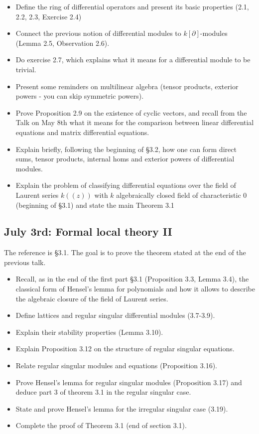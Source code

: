 \documentclass{amsart}
\theoremstyle{definition}
\theoremstyle{remark}
\begin{document}
\begin{itemize}
\item Define the ring of differential operators and present its basic properties (2.1, 2.2, 2.3, Exercise 2.4)
\item Connect the previous notion of differential modules to \(k[\partial]\)-modules (Lemma 2.5, Observation 2.6).
\item Do exercise 2.7, which explains what it means for a differential module to be trivial.
\item Present some reminders on multilinear algebra (tensor products, exterior powers - you can skip symmetric powers).
\item Prove Proposition 2.9 on the existence of cyclic vectors, and recall from the Talk on May 8th what it means for the comparison between linear differential equations and matrix differential equations.
\item Explain briefly, following the beginning of \S 3.2, how one can form direct sums, tensor products, internal homs and exterior powers of differential modules.
\item Explain the problem of classifying differential equations over the field of Laurent series \(k((z))\) with \(k\) algebraically closed field of characteristic \(0\) (beginning of \S 3.1) and state the main Theorem 3.1
\end{itemize}
  
\subsection{July 3rd: Formal local theory II}

The reference is \S 3.1. The goal is to prove the theorem stated at the end of the previous talk.

\begin{itemize}
\item Recall, as in the end of the first part \S 3.1 (Proposition 3.3, Lemma 3.4), the classical form of Hensel's lemma for polynomials and how it allows to describe the algebraic closure of the field of Laurent series.
\item Define lattices and regular singular differential modules (3.7-3.9).
\item Explain their stability properties (Lemma 3.10).
\item Explain Proposition 3.12 on the structure of regular singular equations.
\item Relate regular singular modules and equations (Proposition 3.16).
\item Prove Hensel's lemma for regular singular modules (Proposition 3.17) and deduce part 3 of theorem 3.1 in the regular singular case.
\item State and prove Hensel's lemma for the irregular singular case (3.19).
\item Complete the proof of Theorem 3.1 (end of section 3.1).
\end{itemize}
  
\end{document}
